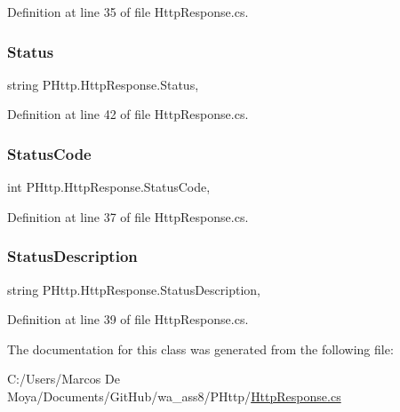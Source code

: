 Definition at line 35 of file Http\+Response.\+cs.

\mbox{\label{class_p_http_1_1_http_response_ac468b6359e6c52f5972683756a2efaaf}} 
\subsubsection{\texorpdfstring{Status}{Status}}
{\footnotesize\ttfamily string P\+Http.\+Http\+Response.\+Status\hspace{0.3cm}{\ttfamily [get]}, {\ttfamily [set]}}



Definition at line 42 of file Http\+Response.\+cs.

\mbox{\label{class_p_http_1_1_http_response_a866c2c9fe87e0f38de6b00dabce1c7a6}} 
\subsubsection{\texorpdfstring{Status\+Code}{StatusCode}}
{\footnotesize\ttfamily int P\+Http.\+Http\+Response.\+Status\+Code\hspace{0.3cm}{\ttfamily [get]}, {\ttfamily [set]}}



Definition at line 37 of file Http\+Response.\+cs.

\mbox{\label{class_p_http_1_1_http_response_aea3f13ebc451a00fe6a0f5e0d8247739}} 
\subsubsection{\texorpdfstring{Status\+Description}{StatusDescription}}
{\footnotesize\ttfamily string P\+Http.\+Http\+Response.\+Status\+Description\hspace{0.3cm}{\ttfamily [get]}, {\ttfamily [set]}}



Definition at line 39 of file Http\+Response.\+cs.



The documentation for this class was generated from the following file\+:\begin{DoxyCompactItemize}
\item 
C\+:/\+Users/\+Marcos De Moya/\+Documents/\+Git\+Hub/wa\+\_\+ass8/\+P\+Http/\hyperlink{_http_response_8cs}{Http\+Response.\+cs}\end{DoxyCompactItemize}

